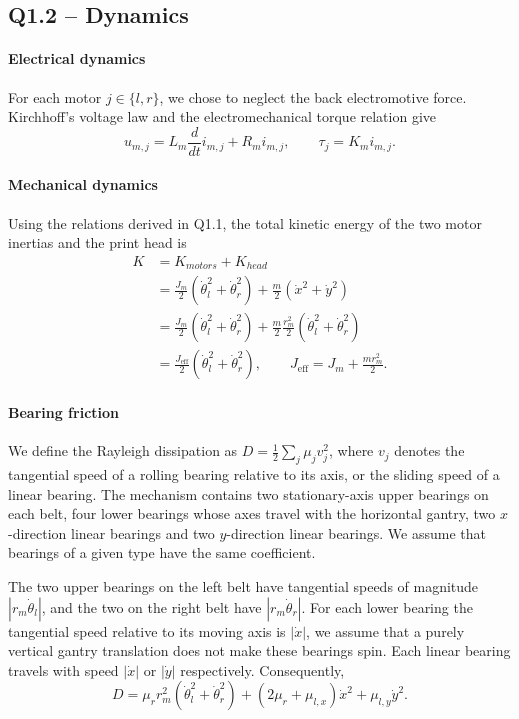 \documentclass[a4paper,12pt]{article}
\begin{document}
\subsection*{Q1.2 -- Dynamics}
\label{sec:q12}

\paragraph{Electrical dynamics}
For each motor $j\in\{l,r\}$, we chose to neglect the back electromotive force. Kirchhoff's voltage law and the electromechanical torque relation give
\begin{equation}
  u_{m,j}=L_m \frac{d}{dt} i_{m,j}+R_m i_{m,j},
  \qquad \tau_j=K_m i_{m,j}.
  \label{eq:q12_electrical}
\end{equation}

\paragraph{Mechanical dynamics}
Using the relations derived in Q1.1, the total kinetic energy of the two motor inertias and the print head is
\begin{align}
  K &= K_{motors} + K_{head} \\
  &= \frac{J_m}{2}(\dot\theta_l^2+\dot\theta_r^2)
       +\frac{m}{2}(\dot x^2+\dot y^2)
  \\ &=\frac{J_m}{2}(\dot\theta_l^2+\dot\theta_r^2) + \frac{m}{2}\frac{r_m^2}{2}(\dot\theta_l^2 + \dot \theta_r^2)\\
    &=\frac{J_{\mathrm{eff}}}{2}(\dot\theta_l^2+\dot\theta_r^2),
  \qquad J_{\mathrm{eff}}=J_m+\frac{m r_m^2}{2}.
  \label{eq:q12_kinetic}
\end{align}


\paragraph{Bearing friction}
We define the Rayleigh dissipation as $D=\frac12\sum_j\mu_j v_j^2$, where $v_j$ denotes the tangential speed of a rolling bearing relative to its axis, or the sliding speed of a linear bearing. The mechanism contains two stationary-axis upper bearings on each belt, four lower bearings whose axes travel with the horizontal gantry, two $x$-direction linear bearings and two $y$-direction linear bearings. We assume that bearings of a given type have the same coefficient.

The two upper bearings on the left belt have tangential speeds of magnitude $|r_m\dot\theta_l|$, and the two on the right belt have $|r_m\dot\theta_r|$. For each lower bearing the tangential speed relative to its moving axis is $|\dot x|$, we assume that a purely vertical gantry translation does not make these bearings spin. Each linear bearing travels with speed $|\dot x|$ or $|\dot y|$ respectively. Consequently,
\begin{equation}
  D =
  \mu_r r_m^2(\dot\theta_l^2+\dot\theta_r^2)
  +(2\mu_r+\mu_{l,x})\dot x^2+\mu_{l,y}\dot y^2.
  \label{eq:q12_dissipation}
\end{equation}
\end{document}
